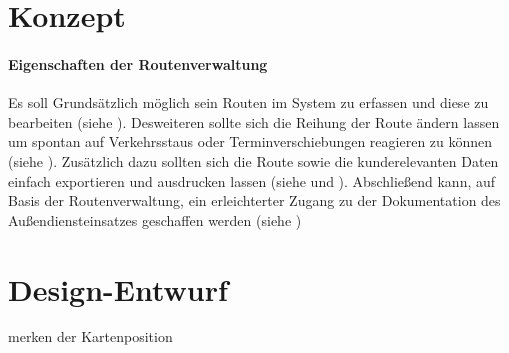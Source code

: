 \documentclass[Bachelorarbeit.tex]{subfiles}
\begin{document}

\section{Konzept}
\label{chap:entwicklung:sec:konzept}


\paragraph{Eigenschaften der Routenverwaltung}

Es soll Grundsätzlich möglich sein Routen im System zu erfassen und diese zu bearbeiten (siehe ).
Desweiteren sollte sich die Reihung der Route ändern lassen um spontan auf Verkehrsstaus oder Terminverschiebungen reagieren zu können (siehe ).
Zusätzlich dazu sollten sich die Route sowie die kunderelevanten Daten einfach exportieren und ausdrucken lassen (siehe  und ). 
Abschließend kann, auf Basis der Routenverwaltung, ein erleichterter Zugang zu der Dokumentation des Außendiensteinsatzes geschaffen werden (siehe )

\section{Design-Entwurf}
\label{chap:entwicklung:sec:design_entwurf}

merken der Kartenposition

\end{document}
